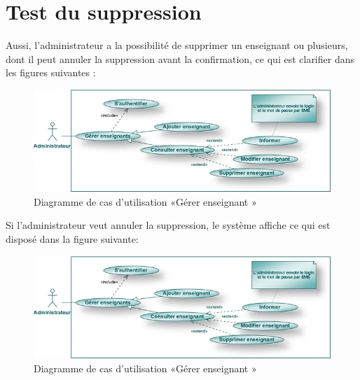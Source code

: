 \documentclass[12 pt ]{report}
\begin{document}
\section{Test du suppression}
Aussi, l'administrateur a la possibilité de supprimer un enseignant ou plusieurs, dont il peut annuler la suppression avant la confirmation, ce qui est clarifier dans les figures suivantes : 
 
\begin{figure}[h]
 \begin{center}
 \includegraphics[width= 13 cm ,height= 6 cm]{admin2.png}
\caption{ Diagramme de cas d'utilisation  «Gérer enseignant »}
 \end{center}
\end{figure}

Si l'administrateur veut annuler la suppression, le système affiche ce qui est disposé dans la figure suivante:
\begin{figure}[h]
 \begin{center}
 \includegraphics[width= 13 cm ,height= 6 cm]{admin2.png}
\caption{ Diagramme de cas d'utilisation  «Gérer enseignant »}
 \end{center}
\end{figure}
\end{document}
